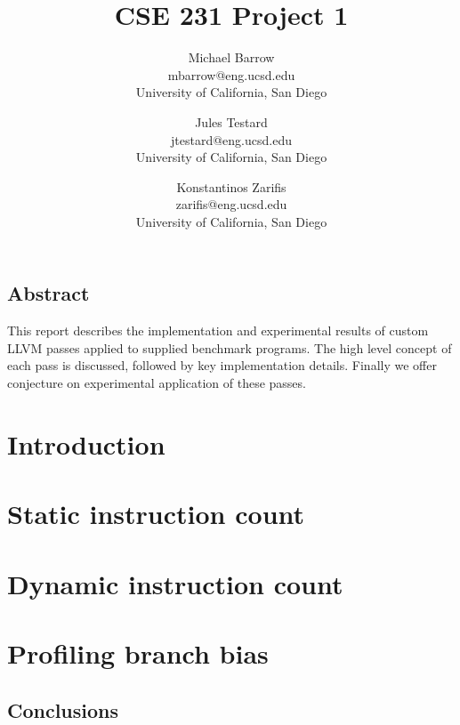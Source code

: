 \documentclass[letterpaper,twocolumn,11pt]{article}
\begin{document}
\date{}

\title{\Large \bf CSE 231 Project 1}

\author{
{\rm Michael Barrow}\\
mbarrow@eng.ucsd.edu\\
University of California, San Diego
\and
{\rm Jules Testard}\\
jtestard@eng.ucsd.edu \\
University of California, San Diego
\and
{Konstantinos Zarifis} \\
zarifis@eng.ucsd.edu \\
University of California, San Diego
}

\maketitle

\thispagestyle{empty}


\subsection*{Abstract}
This report describes the implementation and experimental results of custom LLVM passes applied to supplied benchmark programs. The high level concept of each pass is discussed, followed by key implementation details. Finally we offer conjecture on experimental application of these passes. %

\section{Introduction}


 
\section{Static instruction count}



\section{Dynamic instruction count}



\section{Profiling branch bias}



\subsection{Conclusions}



{\footnotesize 
}

\theendnotes
\end{document}
